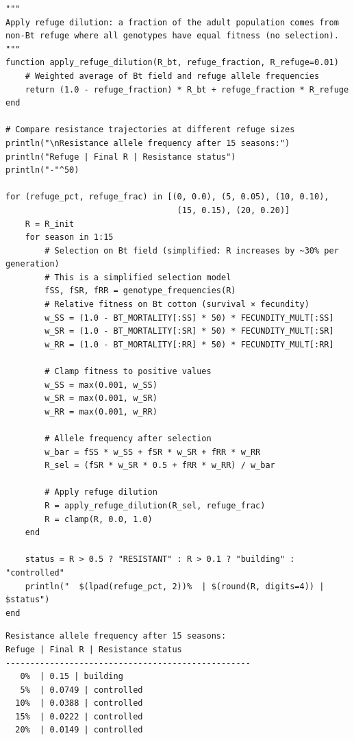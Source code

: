 \begin{verbatim}
"""
Apply refuge dilution: a fraction of the adult population comes from
non-Bt refuge where all genotypes have equal fitness (no selection).
"""
function apply_refuge_dilution(R_bt, refuge_fraction, R_refuge=0.01)
    # Weighted average of Bt field and refuge allele frequencies
    return (1.0 - refuge_fraction) * R_bt + refuge_fraction * R_refuge
end

# Compare resistance trajectories at different refuge sizes
println("\nResistance allele frequency after 15 seasons:")
println("Refuge | Final R | Resistance status")
println("-"^50)

for (refuge_pct, refuge_frac) in [(0, 0.0), (5, 0.05), (10, 0.10),
                                   (15, 0.15), (20, 0.20)]
    R = R_init
    for season in 1:15
        # Selection on Bt field (simplified: R increases by ~30% per generation)
        # This is a simplified selection model
        fSS, fSR, fRR = genotype_frequencies(R)
        # Relative fitness on Bt cotton (survival × fecundity)
        w_SS = (1.0 - BT_MORTALITY[:SS] * 50) * FECUNDITY_MULT[:SS]
        w_SR = (1.0 - BT_MORTALITY[:SR] * 50) * FECUNDITY_MULT[:SR]
        w_RR = (1.0 - BT_MORTALITY[:RR] * 50) * FECUNDITY_MULT[:RR]

        # Clamp fitness to positive values
        w_SS = max(0.001, w_SS)
        w_SR = max(0.001, w_SR)
        w_RR = max(0.001, w_RR)

        # Allele frequency after selection
        w_bar = fSS * w_SS + fSR * w_SR + fRR * w_RR
        R_sel = (fSR * w_SR * 0.5 + fRR * w_RR) / w_bar

        # Apply refuge dilution
        R = apply_refuge_dilution(R_sel, refuge_frac)
        R = clamp(R, 0.0, 1.0)
    end

    status = R > 0.5 ? "RESISTANT" : R > 0.1 ? "building" : "controlled"
    println("  $(lpad(refuge_pct, 2))%  | $(round(R, digits=4)) | $status")
end
\end{verbatim}




\begin{verbatim}
Resistance allele frequency after 15 seasons:
Refuge | Final R | Resistance status
--------------------------------------------------
   0%  | 0.15 | building
   5%  | 0.0749 | controlled
  10%  | 0.0388 | controlled
  15%  | 0.0222 | controlled
  20%  | 0.0149 | controlled
\end{verbatim}



